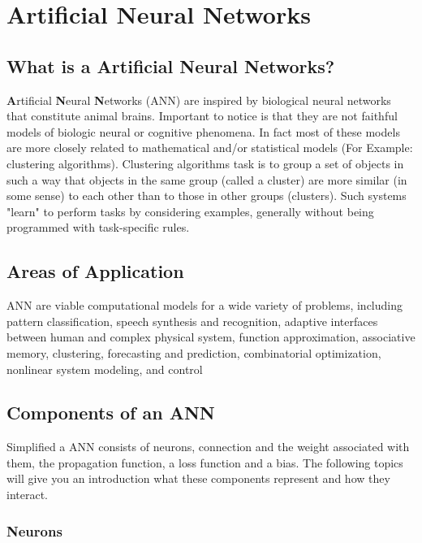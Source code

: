 \chapter{Artificial Neural Networks\authorB}

\section{What is a Artificial Neural Networks?}

  \textbf{A}rtificial \textbf{N}eural \textbf{N}etworks (ANN) are inspired by biological neural networks that constitute animal brains. Important to notice is that they are not faithful models of biologic neural or cognitive phenomena. In fact most of these models are more closely related to mathematical and/or statistical models (For Example: clustering algorithms). Clustering algorithms  task is to group a set of objects in such a way that objects in the same group (called a cluster) are more similar (in some sense) to each other than to those in other groups (clusters). Such systems "learn" to perform tasks by considering examples, generally without being programmed with task-specific rules. 
 
\section{Areas of Application}

 ANN are viable computational models for a wide variety of problems, including pattern classification, speech synthesis and recognition, adaptive interfaces between human and complex physical system, function approximation, associative memory, clustering, forecasting and prediction, combinatorial optimization, nonlinear system modeling, and control
 \cite{fundamentals_ann}
 
\section{Components of an ANN}

Simplified a ANN consists of neurons, connection and the weight associated with them, the propagation function, a loss function and a bias. The following topics will give you an introduction what these components represent and how they interact. 

\subsection{Neurons}

